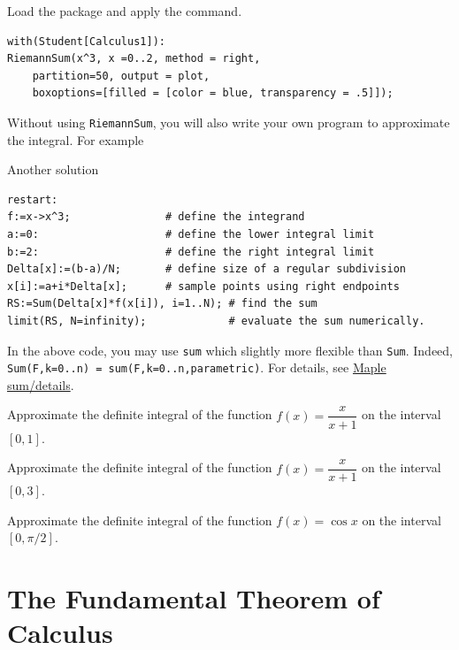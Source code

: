 \documentclass[en,11pt,simple]{elegantbook}
\let\BeginKnitrBlock\begin \let\EndKnitrBlock\end
\begin{document}
\BeginKnitrBlock{solution}{}{}
{}
Load the package and apply the command.

\begin{verbatim}
with(Student[Calculus1]):
RiemannSum(x^3, x =0..2, method = right,
    partition=50, output = plot,
    boxoptions=[filled = [color = blue, transparency = .5]]);
\end{verbatim}
\EndKnitrBlock{solution}

Without using \texttt{RiemannSum}, you will also write your own program to approximate the integral. For example

\BeginKnitrBlock{solution}{Another solution}{}
{}

\begin{verbatim}
restart:  
f:=x->x^3;               # define the integrand
a:=0:                    # define the lower integral limit
b:=2:                    # define the right integral limit
Delta[x]:=(b-a)/N;       # define size of a regular subdivision
x[i]:=a+i*Delta[x];      # sample points using right endpoints
RS:=Sum(Delta[x]*f(x[i]), i=1..N); # find the sum
limit(RS, N=infinity);             # evaluate the sum numerically.
\end{verbatim}
\EndKnitrBlock{solution}

\BeginKnitrBlock{remark}{}{}
{}
In the above code, you may use \texttt{sum} which slightly more flexible than \texttt{Sum}. Indeed, \texttt{Sum(F,k=0..n)\ =\ sum(F,k=0..n,parametric)}. For details, see \href{https://www.maplesoft.com/support/help/Maple/view.aspx?path=sum/details}{Maple sum/details}.
\EndKnitrBlock{remark}

\BeginKnitrBlock{exercise}{}{}
\protect\hypertarget{exr:unnamed-chunk-135}{}{\label{exr:unnamed-chunk-135} }
Approximate the definite integral of the function \(f(x)=\dfrac{x}{x+1}\) on the interval \([0, 1]\).
\EndKnitrBlock{exercise}

\BeginKnitrBlock{exercise}{}{}
\protect\hypertarget{exr:unnamed-chunk-136}{}{\label{exr:unnamed-chunk-136} }
Approximate the definite integral of the function \(f(x)=\dfrac{x}{x+1}\) on the interval \([0, 3]\).
\EndKnitrBlock{exercise}

\BeginKnitrBlock{exercise}{}{}
\protect\hypertarget{exr:unnamed-chunk-137}{}{\label{exr:unnamed-chunk-137} }
Approximate the definite integral of the function \(f(x)=\cos x\) on the interval \([0, \pi/2]\).
\EndKnitrBlock{exercise}

\hypertarget{the-fundamental-theorem-of-calculus}{%
\section{The Fundamental Theorem of Calculus}\label{the-fundamental-theorem-of-calculus}}
\end{document}
